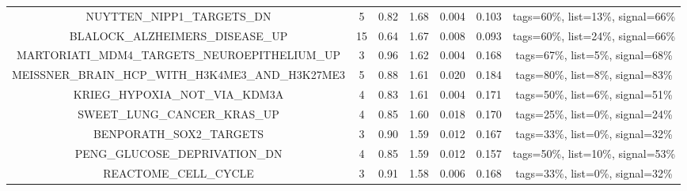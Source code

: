 \begin{table}[h!]
{\begin{tabular}{ccccccc}
    NUYTTEN\_NIPP1\_TARGETS\_DN                                   & 5                     & 0.82                     & 1.68                     & 0.004                     & 0.103                     & tags=60\%, list=13\%, signal=66\%                    \\
    BLALOCK\_ALZHEIMERS\_DISEASE\_UP                              & 15                    & 0.64                     & 1.67                     & 0.008                     & 0.093                     & tags=60\%, list=24\%, signal=66\%                    \\
    MARTORIATI\_MDM4\_TARGETS\_NEUROEPITHELIUM\_UP                & 3                     & 0.96                     & 1.62                     & 0.004                     & 0.168                     & tags=67\%, list=5\%, signal=68\%                     \\
    MEISSNER\_BRAIN\_HCP\_WITH\_H3K4ME3\_AND\_H3K27ME3            & 5                     & 0.88                     & 1.61                     & 0.020                     & 0.184                     & tags=80\%, list=8\%, signal=83\%                     \\
    KRIEG\_HYPOXIA\_NOT\_VIA\_KDM3A                               & 4                     & 0.83                     & 1.61                     & 0.004                     & 0.171                     & tags=50\%, list=6\%, signal=51\%                     \\
    SWEET\_LUNG\_CANCER\_KRAS\_UP                                 & 4                     & 0.85                     & 1.60                     & 0.018                     & 0.170                     & tags=25\%, list=0\%, signal=24\%                     \\
    BENPORATH\_SOX2\_TARGETS                                      & 3                     & 0.90                     & 1.59                     & 0.012                     & 0.167                     & tags=33\%, list=0\%, signal=32\%                     \\
    PENG\_GLUCOSE\_DEPRIVATION\_DN                                & 4                     & 0.85                     & 1.59                     & 0.012                     & 0.157                     & tags=50\%, list=10\%, signal=53\%                    \\
    REACTOME\_CELL\_CYCLE                                         & 3                     & 0.91                     & 1.58                     & 0.006                     & 0.168                     & tags=33\%, list=0\%, signal=32\%                     \\

\end{tabular}}
\end{table}
